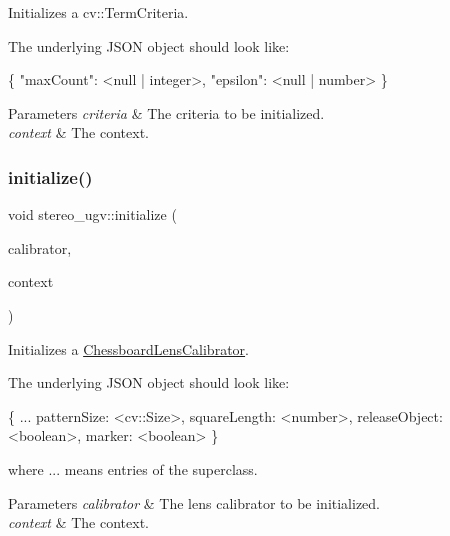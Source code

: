 Initializes a cv\+::\+Term\+Criteria. 

The underlying J\+S\+ON object should look like\+: 
\begin{DoxyCode}
\{
  \textcolor{stringliteral}{"maxCount"}: <null | integer>,
  \textcolor{stringliteral}{"epsilon"}: <null | number>
\}
\end{DoxyCode}
 
\begin{DoxyParams}{Parameters}
{\em criteria} & The criteria to be initialized. \\
\hline
{\em context} & The context. \\
\hline
\end{DoxyParams}
\mbox{\label{namespacestereo__ugv_a8e8ff522fb8d2300fcdfc02ab0025e98}} 
\subsubsection{\texorpdfstring{initialize()}{initialize()}\hspace{0.1cm}{\footnotesize\ttfamily [7/8]}}
{\footnotesize\ttfamily void stereo\+\_\+ugv\+::initialize (\begin{DoxyParamCaption}\item[{\hyperlink{classstereo__ugv_1_1ChessboardLensCalibrator}{Chessboard\+Lens\+Calibrator} $\ast$}]{calibrator,  }\item[{const \hyperlink{classstereo__ugv_1_1Context}{Context} \&}]{context }\end{DoxyParamCaption})}



Initializes a \hyperlink{classstereo__ugv_1_1ChessboardLensCalibrator}{Chessboard\+Lens\+Calibrator}. 

The underlying J\+S\+ON object should look like\+: 
\begin{DoxyCode}
\{
  ...
  patternSize: <cv::Size>,
  squareLength: <number>,
  releaseObject: <\textcolor{keywordtype}{boolean}>,
  marker: <\textcolor{keywordtype}{boolean}>
\}
\end{DoxyCode}
 where ... means entries of the superclass. 
\begin{DoxyParams}{Parameters}
{\em calibrator} & The lens calibrator to be initialized. \\
\hline
{\em context} & The context. \\
\hline
\end{DoxyParams}
\mbox{\label{namespacestereo__ugv_acaec0936792769b5d676773f7d4070cd}} 
